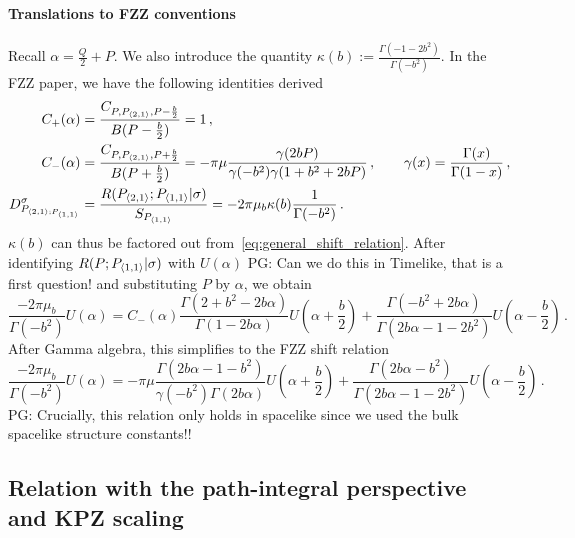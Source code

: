 \documentclass[a4paper]{article}
\newcommand{\purple}[1]{{\color{purple} #1 \color{black}}}
\newcommand{\PG}[1]{{\purple{PG: #1}}} %
\begin{document}
\paragraph{Translations to FZZ conventions}
Recall $\alpha = \frac{Q}{2}+P$. We also introduce the quantity $\kappa(b) :=\frac{\Gamma(-1-2b^2)}{\Gamma(-b^2)} $. In the FZZ paper, we have the following identities derived
\begin{equation}
\begin{aligned}
    C_{+}(\alpha) &=  \frac{C_{P,P_{\braket{2,1}}, P - \frac{b}{2}}}{B(P-\frac{b}{2})} = 1\,,\\
    C_{-}(\alpha) &= \frac{C_{P,P_{\braket{2,1}}, P + \frac{b}{2}}}{B(P+\frac{b}{2})} =-\pi \mu \frac{\gamma(2bP)}{\gamma(-b^2)\gamma(1+b^2+2bP)}\,,\qquad \gamma(x) = \frac{\Gamma(x)}{\Gamma(1-x)}\,,\\
    D_{P_{\braket{2,1};P_{\braket{1,1}}}}^\sigma &= \frac{R(P_{\braket{2,1}};P_{\braket{1,1}}|\sigma)}{S_{P_{\braket{1,1}}}} = -2\pi\mu_b \kappa(b)\frac{1}{\Gamma(-b^2)} \,.
\end{aligned}
\end{equation}
$\kappa(b)$ can thus be factored out from~\eqref{eq:general_shift_relation}. After identifying $R(P;P_{\braket{1,1}}|\sigma)$ with $U(\alpha)$ \PG{Can we do this in Timelike, that is a first question!} and substituting $P$ by $\alpha$, we obtain
\begin{equation}
  \frac{-2\pi\mu_b}{\Gamma(-b^2)}U(\alpha) = C_{-}(\alpha)\frac{\Gamma(2+b^2-2b\alpha)}{\Gamma(1-2b\alpha)}U(\alpha+\frac{b}{2})+\frac{\Gamma(-b^2+2b\alpha)}{\Gamma(2b\alpha-1-2b^2)}U\left(\alpha-\frac{b}{2}\right)\,.
\end{equation}
After Gamma algebra, this simplifies to the FZZ shift relation
\begin{equation}
  \frac{-2\pi\mu_b}{\Gamma(-b^2)}U(\alpha) = -\pi \mu \frac{\Gamma(2b\alpha-1-b^2)}{\gamma(-b^2)\Gamma(2b\alpha)}U(\alpha+\frac{b}{2})+\frac{\Gamma(2b\alpha-b^2)}{\Gamma(2b\alpha-1-2b^2)}U\left(\alpha-\frac{b}{2}\right)\,.
\end{equation}
\PG{Crucially, this relation only holds in spacelike since we used the bulk spacelike structure constants!!}

\subsection{Relation with the path-integral perspective and KPZ scaling}
\end{document}
